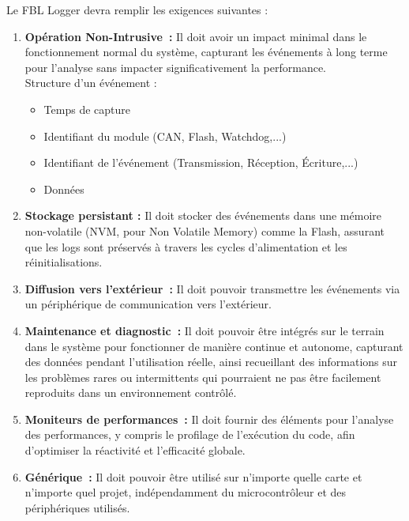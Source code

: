 \documentclass[a4paper, 12pt]{report}
\begin{document}
Le FBL Logger devra remplir les exigences suivantes :
\begin{enumerate}

\item \textbf{Opération Non-Intrusive :} Il doit avoir un impact minimal dans le fonctionnement normal du système, capturant les événements à long terme pour l'analyse sans impacter significativement la performance.
\\ Structure d'un événement :
\begin{itemize}
    \item Temps de capture
    \item Identifiant du module (CAN, Flash, Watchdog,...)
    \item Identifiant de l'événement (Transmission, Réception, Écriture,...)
    \item Données
\end{itemize}

\item \textbf{Stockage persistant :} Il doit stocker des événements dans une mémoire non-volatile (\acs{NVM}, pour Non Volatile Memory) comme la Flash, assurant que les logs sont préservés à travers les cycles d'alimentation et les réinitialisations.

\item \textbf{Diffusion vers l'extérieur :} Il doit pouvoir transmettre les événements via un périphérique de communication vers l'extérieur.

\item \textbf{Maintenance et diagnostic :} Il doit pouvoir être intégrés sur le terrain dans le système pour fonctionner de manière continue et autonome, capturant des données pendant l'utilisation réelle, ainsi recueillant des informations sur les problèmes rares ou intermittents qui pourraient ne pas être facilement reproduits dans un environnement contrôlé.

\item \textbf{Moniteurs de performances :} Il doit fournir des éléments pour l’analyse des performances, y compris le profilage de l’exécution du code, afin d’optimiser la réactivité et l’efficacité globale.

\item \textbf{Générique :} Il doit pouvoir être utilisé sur n'importe quelle carte et n’importe quel projet, indépendamment du microcontrôleur et des périphériques utilisés.

\end{enumerate}
\end{document}
